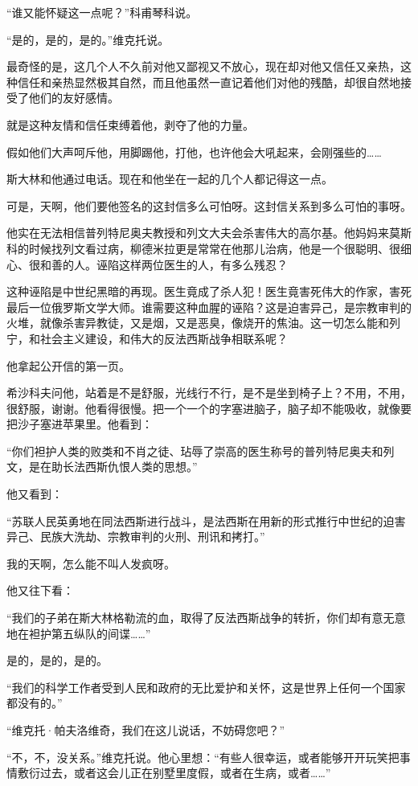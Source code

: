 “谁又能怀疑这一点呢？”科甫琴科说。

“是的，是的，是的。”维克托说。

最奇怪的是，这几个人不久前对他又鄙视又不放心，现在却对他又信任又亲热，这种信任和亲热显然极其自然，而且他虽然一直记着他们对他的残酷，却很自然地接受了他们的友好感情。

就是这种友情和信任束缚着他，剥夺了他的力量。

假如他们大声呵斥他，用脚踢他，打他，也许他会大吼起来，会刚强些的……

斯大林和他通过电话。现在和他坐在一起的几个人都记得这一点。

可是，天啊，他们要他签名的这封信多么可怕呀。这封信关系到多么可怕的事呀。

他实在无法相信普列特尼奥夫教授和列文大夫会杀害伟大的高尔基。他妈妈来莫斯科的时候找列文看过病，柳德米拉更是常常在他那儿治病，他是一个很聪明、很细心、很和善的人。诬陷这样两位医生的人，有多么残忍？

这种诬陷是中世纪黑暗的再现。医生竟成了杀人犯！医生竟害死伟大的作家，害死最后一位俄罗斯文学大师。谁需要这种血腥的诬陷？这是迫害异己，是宗教审判的火堆，就像杀害异教徒，又是烟，又是恶臭，像烧开的焦油。这一切怎么能和列宁，和社会主义建设，和伟大的反法西斯战争相联系呢？

他拿起公开信的第一页。

希沙科夫问他，站着是不是舒服，光线行不行，是不是坐到椅子上？不用，不用，很舒服，谢谢。他看得很慢。把一个一个的字塞进脑子，脑子却不能吸收，就像要把沙子塞进苹果里。他看到：

“你们袒护人类的败类和不肖之徒、玷辱了崇高的医生称号的普列特尼奥夫和列文，是在助长法西斯仇恨人类的思想。”

他又看到：

“苏联人民英勇地在同法西斯进行战斗，是法西斯在用新的形式推行中世纪的迫害异己、民族大洗劫、宗教审判的火刑、刑讯和拷打。”

我的天啊，怎么能不叫人发疯呀。

他又往下看：

“我们的子弟在斯大林格勒流的血，取得了反法西斯战争的转折，你们却有意无意地在袒护第五纵队的间谍……”

是的，是的，是的。

“我们的科学工作者受到人民和政府的无比爱护和关怀，这是世界上任何一个国家都没有的。”

“维克托·帕夫洛维奇，我们在这儿说话，不妨碍您吧？”

“不，不，没关系。”维克托说。他心里想：“有些人很幸运，或者能够开开玩笑把事情敷衍过去，或者这会儿正在别墅里度假，或者在生病，或者……”

